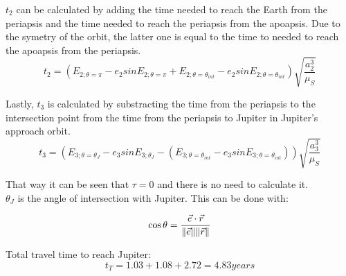 $t_{2}$ can be calculated by adding the time needed to reach the Earth from the periapsis and the time needed to reach the periapsis from the apoapsis. Due to the symetry of the orbit, the latter one is equal to the time to needed to reach the apoapsis from the periapsis.
\begin{equation*}
t_2=(E_{2;\theta=\pi}-e_2sinE_{2;\theta=\pi}+E_{2;\theta=\theta_{int}}-e_2sinE_{2;\theta=\theta_{int}})\sqrt{\frac{a_2^3}{\mu_S}} %
\end{equation*}

Lastly, $t_3$ is calculated by substracting the time from the periapsis to the intersection point from the time from the periapsis to Jupiter in Jupiter's approach orbit. 
\begin{equation*}
t_3=(E_{3;\theta=\theta_J}-e_3sinE_{3;\theta_J}-(E_{3;\theta=\theta_{int}}-e_3sinE_{3;\theta=\theta_{int}}))\sqrt{\frac{a_3^3}{\mu_S}} %
\end{equation*}

That way it can be seen that $\tau=0$ and there is no need to calculate it. \\

$\theta_J$ is the angle of intersection with Jupiter. This can be done with:

\begin{equation*}
\cos{\theta} = \frac{\vec{e}\cdot\vec{r}}{\lVert\vec{e}\rVert \lVert\vec{r}\rVert}
\end{equation*}

Total travel time to reach Jupiter:
\begin{equation*}
t_T = 1.03 + 1.08 + 2.72 = 4.83 years
\end{equation*}

\nocite{franchini2008introduccion}
\nocite{curtis2013orbital}